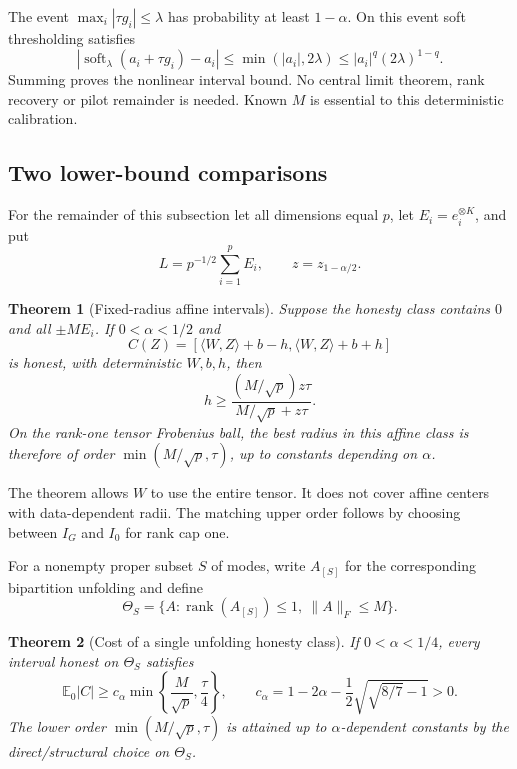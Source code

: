 \documentclass[11pt]{article}
\newtheorem{theorem}{Theorem}
\theoremstyle{remark}
\newcommand{\E}{\mathbb E}
\newcommand{\ip}[2]{\langle #1,#2\rangle}
\newcommand{\norm}[1]{\lVert #1\rVert}
\newcommand{\rank}{\operatorname{rank}}
\newcommand{\soft}{\operatorname{soft}}
\begin{document}
The event $\max_i|\tau g_i|\le\lambda$ has probability at least $1-\alpha$. On this event soft thresholding satisfies
\[
 |\soft_\lambda(a_i+\tau g_i)-a_i|\le\min(|a_i|,2\lambda)
 \le |a_i|^q(2\lambda)^{1-q}.
\]
Summing proves the nonlinear interval bound. No central limit theorem, rank recovery or pilot remainder is needed. Known $M$ is essential to this deterministic calibration.

\subsection{Two lower-bound comparisons}

For the remainder of this subsection let all dimensions equal $p$, let $E_i=e_i^{\otimes K}$, and put
\begin{equation}\label{eq:equalL}
 L=p^{-1/2}\sum_{i=1}^p E_i,\qquad z=z_{1-\alpha/2}.
\end{equation}

\begin{theorem}[Fixed-radius affine intervals]\label{thm:affine}
Suppose the honesty class contains $0$ and all $\pm M E_i$. If $0<\alpha<1/2$ and
\[
 C(Z)=[\ip WZ+b-h,\ip WZ+b+h]
\]
is honest, with deterministic $W,b,h$, then
\begin{equation}\label{eq:affinelower}
 h\ge\frac{(M/\sqrt p)z\tau}{M/\sqrt p+z\tau}.
\end{equation}
On the rank-one tensor Frobenius ball, the best radius in this affine class is therefore of order $\min(M/\sqrt p,\tau)$, up to constants depending on $\alpha$.
\end{theorem}

The theorem allows $W$ to use the entire tensor. It does not cover affine centers with data-dependent radii. The matching upper order follows by choosing between $I_G$ and $I_0$ for rank cap one.

For a nonempty proper subset $S$ of modes, write $A_{[S]}$ for the corresponding bipartition unfolding and define
\begin{equation}\label{eq:relax}
 \Theta_S=\{A:\rank(A_{[S]})\le1,\ \norm A_F\le M\}.
\end{equation}

\begin{theorem}[Cost of a single unfolding honesty class]\label{thm:unfolding}
If $0<\alpha<1/4$, every interval honest on $\Theta_S$ satisfies
\begin{equation}\label{eq:unfoldlower}
 \E_0|C|\ge c_\alpha\min\left\{\frac M{\sqrt p},\frac\tau4\right\},\qquad
 c_\alpha=1-2\alpha-\frac12\sqrt{\sqrt{8/7}-1}>0.
\end{equation}
The lower order $\min(M/\sqrt p,\tau)$ is attained up to $\alpha$-dependent constants by the direct/structural choice on $\Theta_S$.
\end{theorem}
\end{document}
